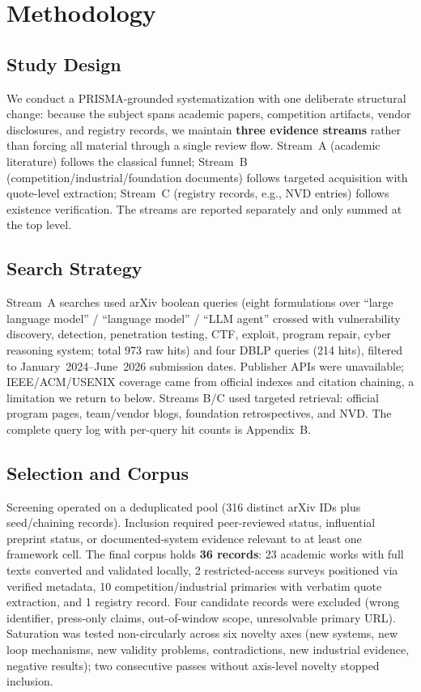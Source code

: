 \section{Methodology}
\label{sec:method}

\subsection{Study Design}
We conduct a PRISMA-grounded systematization with one deliberate structural change: because the
subject spans academic papers, competition artifacts, vendor disclosures, and registry records,
we maintain \textbf{three evidence streams} rather than forcing all material through a single
review flow. Stream~A (academic literature) follows the classical funnel; Stream~B
(competition/industrial/foundation documents) follows targeted acquisition with quote-level
extraction; Stream~C (registry records, e.g., NVD entries) follows existence verification. The
streams are reported separately and only summed at the top level.

\subsection{Search Strategy}
Stream~A searches used arXiv boolean queries (eight formulations over ``large language model''
/ ``language model'' / ``LLM agent'' crossed with vulnerability discovery, detection,
penetration testing, CTF, exploit, program repair, cyber reasoning system; total 973 raw hits)
and four DBLP queries (214 hits), filtered to January~2024--June~2026 submission dates.
Publisher APIs were unavailable; IEEE/ACM/USENIX coverage came from official indexes and
citation chaining, a limitation we return to below. Streams B/C used targeted retrieval:
official program pages, team/vendor blogs, foundation retrospectives, and NVD. The complete
query log with per-query hit counts is Appendix~B.

\subsection{Selection and Corpus}
Screening operated on a deduplicated pool (316 distinct arXiv IDs plus seed/chaining records).
Inclusion required peer-reviewed status, influential preprint status, or documented-system
evidence relevant to at least one framework cell. The final corpus holds \textbf{36 records}:
23 academic works with full texts converted and validated locally, 2 restricted-access
surveys positioned via verified metadata, 10 competition/industrial primaries with verbatim
quote extraction, and 1 registry record. Four candidate records were excluded (wrong
identifier, press-only claims, out-of-window scope, unresolvable primary URL). Saturation was
tested non-circularly across six novelty axes (new systems, new loop mechanisms, new validity
problems, contradictions, new industrial evidence, negative results); two consecutive passes
without axis-level novelty stopped inclusion.

